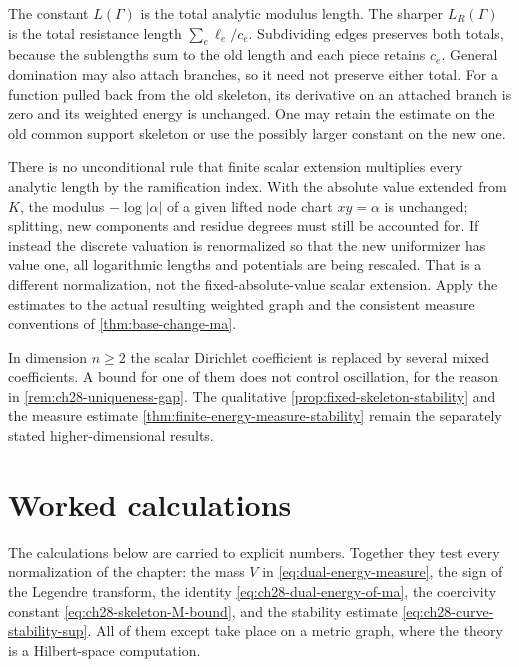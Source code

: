 \begin{remark}
\label{rem:ch28-curve-constant}
The constant \(L(\Gamma)\) is the total analytic modulus length.
The sharper \(L_R(\Gamma)\) is the total resistance length
\(\sum_e\ell_e/c_e\).  Subdividing edges preserves both totals, because
the sublengths sum to the old length and each piece retains \(c_e\).
General domination may also attach branches, so it need not preserve
either total.  For a function pulled back from the old skeleton, its
derivative on an attached branch is zero and its weighted energy is
unchanged.  One may retain the estimate on the old common support
skeleton or use the possibly larger constant on the new one.

There is no unconditional rule that finite scalar extension multiplies
every analytic length by the ramification index.  With the absolute value
extended from \(K\), the modulus \(-\log|\alpha|\) of a given lifted
node chart \(xy=\alpha\) is unchanged; splitting, new components and
residue degrees must still be accounted for.  If instead the discrete
valuation is renormalized so that the new uniformizer has value one,
all logarithmic lengths and potentials are being rescaled.  That is a
different normalization, not the fixed-absolute-value scalar extension.
Apply the estimates to the actual resulting weighted graph and the
consistent measure conventions of \cref{thm:base-change-ma}.

In dimension \(n\geq2\) the scalar Dirichlet coefficient is replaced by
several mixed coefficients.  A bound for one of them does not control
oscillation, for the reason in \cref{rem:ch28-uniqueness-gap}.
The qualitative \cref{prop:fixed-skeleton-stability} and the
measure estimate \cref{thm:finite-energy-measure-stability} remain the
separately stated higher-dimensional results.
\end{remark}

\section{Worked calculations}
\label{sec:ch28-curves}

The calculations below are carried to explicit numbers.  Together they test
every normalization of the chapter: the mass \(V\) in
\eqref{eq:dual-energy-measure}, the sign of the Legendre transform, the
identity \eqref{eq:ch28-dual-energy-of-ma}, the coercivity constant
\eqref{eq:ch28-skeleton-M-bound}, and the stability estimate
\eqref{eq:ch28-curve-stability-sup}.  All of them except
 take place on a metric graph, where the
theory is a Hilbert-space computation.

